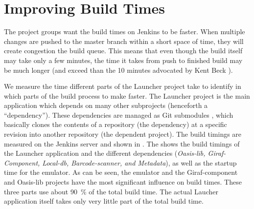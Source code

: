 \chapter{Improving Build Times}
The project groups want the build times on Jenkins to be faster. When multiple changes are pushed to the master branch within a short space of time, they will create congestion the build queue. This means that even though the build itself may take only a few minutes, the time it takes from push to finished build may be much longer (and exceed than the 10 minutes advocated by Kent Beck \parencite{beck2004}).

We measure the time different parts of the Launcher project take to identify in which parts of the build process to make faster. The Launcher project is the main application which depends on many other subprojects (henceforth a ``dependency''). These dependencies are managed as Git submodules \parencite{git-submodules-doc}, which basically clones the contents of a repository (the dependency) at a specific revision into another repository (the dependent project). The build timings are measured on the Jenkins server and shown in . The shows the build timings of the Launcher application and the different dependencies (\emph{Oasis-lib, Giraf-Component, Local-db, Barcode-scanner, and Metadata}), as well as the startup time for the emulator. As can be seen, the emulator and the Giraf-component and Oasis-lib projects have the most significant influence on build times. These three parts use about \SI{90}{\percent} of the total build time. The actual Laucher application itself takes only very little part of the total build time.

